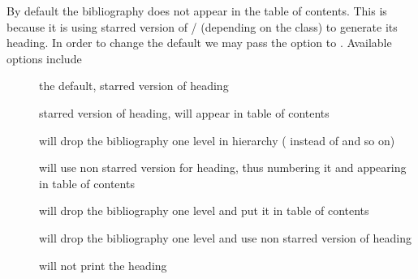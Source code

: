 
By default the bibliography does not appear in the table of contents. This is
because it is using starred version of \slash{}
(depending on the class) to generate its heading. In order to change the default we
may pass the option  to . Available
options include
\begin{description}
  \item[] the default, starred version of heading
  \item[] starred version of heading, will appear in table of contents
  \item[] will drop the bibliography one level in
  hierarchy ( instead of  and so on)
  \item[] will use non starred version for heading, thus
  numbering it and appearing in table of contents
  \item[] will drop the bibliography one level and put it in
  table of contents
  \item[] will drop the bibliography one level and use
  non starred version of heading
  \item[] will not print the heading
\end{description}

